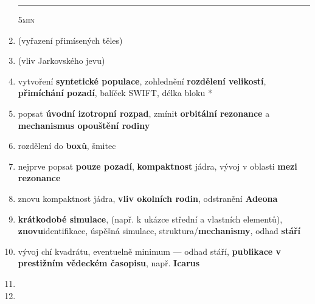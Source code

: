 \documentclass[a4paper, 12pt]{article}
\begin{document}
\begin{enumerate}[wide, label=\arabic*/21]
\hrule
\hfill \textsc{5min}
\newpage
\item (vyřazení přimísených těles) 
\item (vliv Jarkovského jevu)
\item vytvoření \textbf{syntetické populace}, zohlednění \textbf{rozdělení velikostí}, \textbf{přimíchání pozadí}, balíček SWIFT, délka bloku *
\item popsat \textbf{úvodní izotropní rozpad}, zmínit \textbf{orbitální rezonance} a \textbf{mechanismus opouštění rodiny}
\item rozdělení do \textbf{boxů}, šmitec
\item nejprve popsat \textbf{pouze pozadí}, \textbf{kompaktnost} jádra, vývoj v oblasti \textbf{mezi rezonance} 
\item znovu kompaktnost jádra, \textbf{vliv okolních rodin}, odstranění \textbf{Adeona}
\item \textbf{krátkodobé simulace}, (např. k ukázce střední a vlastních elementů), \textbf{znovu}identifikace, úspěšná simulace, struktura/\textbf{mechanismy}, odhad \textbf{stáří}
\item vývoj chí kvadrátu, eventuelně minimum --- odhad stáří, \textbf{publikace v prestižním vědeckém časopisu}, např. \textbf{Icarus}
\item {}
\item {}
\end{enumerate}
\end{document}
